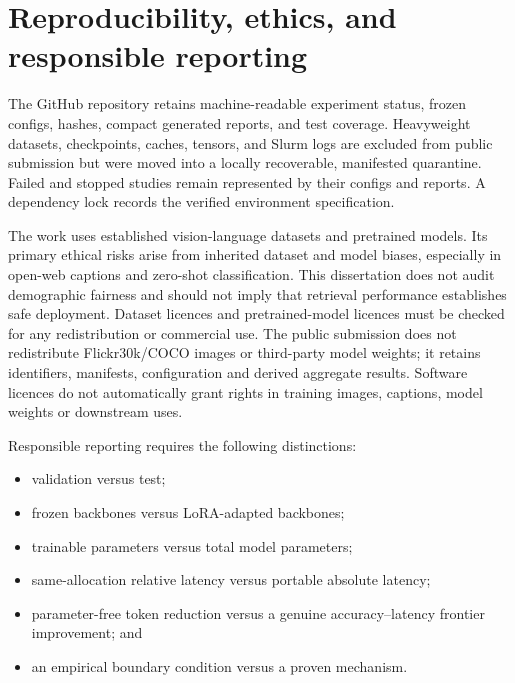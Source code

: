 \documentclass[11pt,a4paper,oneside]{report}
\begin{document}
\chapter{Reproducibility, ethics, and responsible reporting}
The GitHub repository retains machine-readable experiment status, frozen configs, hashes, compact generated reports, and test coverage. Heavyweight datasets, checkpoints, caches, tensors, and Slurm logs are excluded from public submission but were moved into a locally recoverable, manifested quarantine. Failed and stopped studies remain represented by their configs and reports. A dependency lock records the verified environment specification.

The work uses established vision-language datasets and pretrained models. Its primary ethical risks arise from inherited dataset and model biases, especially in open-web captions and zero-shot classification. This dissertation does not audit demographic fairness and should not imply that retrieval performance establishes safe deployment. Dataset licences and pretrained-model licences must be checked for any redistribution or commercial use. The public submission does not redistribute Flickr30k/COCO images or third-party model weights; it retains identifiers, manifests, configuration and derived aggregate results. Software licences do not automatically grant rights in training images, captions, model weights or downstream uses.

Responsible reporting requires the following distinctions:

\begin{itemize}
\item validation versus test;
\item frozen backbones versus LoRA-adapted backbones;
\item trainable parameters versus total model parameters;
\item same-allocation relative latency versus portable absolute latency;
\item parameter-free token reduction versus a genuine accuracy--latency frontier improvement; and
\item an empirical boundary condition versus a proven mechanism.
\end{itemize}
\end{document}

